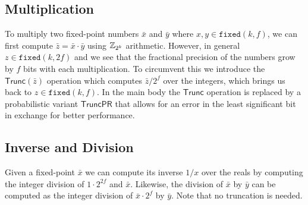 \subsection{Multiplication}
To multiply two fixed-point numbers $\bar{x}$ and $\bar{y}$ where $x, y \in
\mathtt{fixed}(k, f)$, we can first compute $\bar{z} = \bar{x} \cdot \bar{y}$
using $\mathbb{Z}_{2^k}$ arithmetic. However, in general $z \in \mathtt{fixed}(k,
2f)$ and we see that the fractional precision of the numbers grow by $f$ bits
with each multiplication. To circumvent this we introduce the
$\mathsf{Trunc}(\bar{z})$ operation which computes $\bar{z} / 2^{f}$ over the
integers, which brings us back to $z \in \mathtt{fixed}(k, f)$. In the main
body the $\mathsf{Trunc}$ operation is replaced by a probabilistic variant
$\mathsf{TruncPR}$ that allows for an error in the least significant bit in
exchange for better performance.






\subsection{Inverse and Division}

Given a fixed-point $\bar{x}$ we can compute its inverse $1/x$ over the reals by computing the integer division of $1 \cdot 2^{2f}$ and $\bar{x}$. Likewise, the division of $\bar{x}$ by $\bar{y}$ can be computed as the integer division of $\bar{x} \cdot 2^f$ by $\bar{y}$. Note that no truncation is needed.
